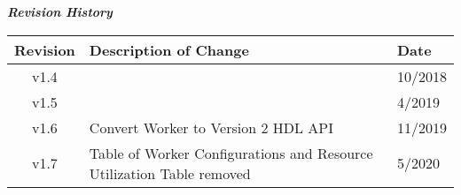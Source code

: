 \iffalse
This file is protected by Copyright. Please refer to the COPYRIGHT file
distributed with this source distribution.

This file is part of OpenCPI <http://www.opencpi.org>

OpenCPI is free software: you can redistribute it and/or modify it under the
terms of the GNU Lesser General Public License as published by the Free Software
Foundation, either version 3 of the License, or (at your option) any later
version.

OpenCPI is distributed in the hope that it will be useful, but WITHOUT ANY
WARRANTY; without even the implied warranty of MERCHANTABILITY or FITNESS FOR A
PARTICULAR PURPOSE. See the GNU Lesser General Public License for more details.

You should have received a copy of the GNU Lesser General Public License along
with this program. If not, see <http://www.gnu.org/licenses/>.
\fi

\def\comp{iq\_{}imbalance\_{}fixer}
\edef\ecomp{iq_imbalance_fixer}
\def\Comp{IQ Imbalance Fixer}
\def\docTitle{\Comp{} Component Data Sheet}
\def\snippetpath{../../../../../../doc/av/tex/snippets}

\graphicspath{{figures/}}


\maketitle
\thispagestyle{empty}
\newpage

\begin{center}
	\textit{\textbf{Revision History}}
	\begin{table}[H]
	\label{table:revisions} %
		\begin{tabularx}{\textwidth}{|c|X|l|}
		\hline
		\rowcolor{blue}
		\textbf{Revision} & \textbf{Description of Change} & \textbf{Date} \\
		\hline
		v1.4 & & 10/2018 \\
		\hline
		v1.5 & & 4/2019\\
		\hline
		v1.6 & Convert Worker to Version 2 HDL API & 11/2019\\
		\hline
		v1.7 & Table of Worker Configurations and Resource Utilization Table removed & 5/2020 \\
			\hline
		\end{tabularx}
	\end{table}
\end{center}
\newpage

